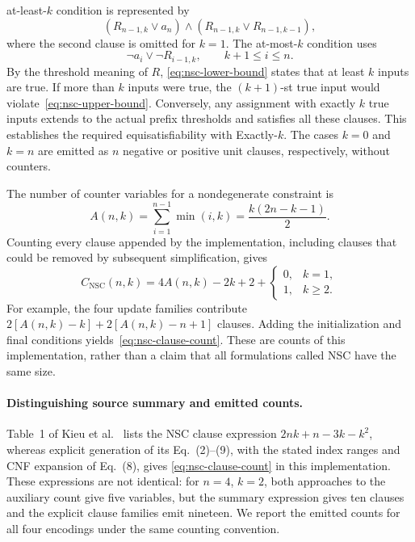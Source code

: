 \documentclass[a4paper,fleqn]{cas-sc}
\begin{document}
at-least-$k$ condition is represented by
\begin{equation}
 (R_{n-1,k}\lor a_n)\land
 (R_{n-1,k}\lor R_{n-1,k-1}),
 \label{eq:nsc-lower-bound}
\end{equation}
where the second clause is omitted for $k=1$. The at-most-$k$ condition
uses
\begin{equation}
 \neg a_i\lor\neg R_{i-1,k},\qquad k+1\leq i\leq n.
 \label{eq:nsc-upper-bound}
\end{equation}
By the threshold meaning of $R$, \eqref{eq:nsc-lower-bound} states that
at least $k$ inputs are true. If more than $k$ inputs were true, the
$(k+1)$-st true input would violate~\eqref{eq:nsc-upper-bound}. Conversely,
any assignment with exactly $k$ true inputs extends to the actual prefix
thresholds and satisfies all these clauses. This establishes the required
equisatisfiability with Exactly-$k$. The cases $k=0$ and $k=n$ are emitted
as $n$ negative or positive unit clauses, respectively, without counters.

The number of counter variables for a nondegenerate constraint is
\begin{equation}
 A(n,k)=\sum_{i=1}^{n-1}\min(i,k)
       =\frac{k(2n-k-1)}{2}.
 \label{eq:nsc-aux-count}
\end{equation}
Counting every clause appended by the implementation, including clauses
that could be removed by subsequent simplification, gives
\begin{equation}
 C_{\mathrm{NSC}}(n,k)
 =4A(n,k)-2k+2+\begin{cases}0,&k=1,\\1,&k\geq2.\end{cases}
 \label{eq:nsc-clause-count}
\end{equation}
For example, the four update families contribute
$2[A(n,k)-k]+2[A(n,k)-n+1]$ clauses. Adding the initialization and final
conditions yields~\eqref{eq:nsc-clause-count}. These are counts of this
implementation, rather than a claim that all formulations called NSC have
the same size.

\paragraph{Distinguishing source summary and emitted counts.}
Table~1 of Kieu et al.~\cite{kieu2025nse} lists the NSC clause expression
$2nk+n-3k-k^2$, whereas explicit generation of its Eq.~(2)--(9), with
the stated index ranges and CNF expansion of Eq.~(8), gives
\eqref{eq:nsc-clause-count} in this implementation. These expressions
are not identical: for $n=4$, $k=2$, both approaches to the auxiliary
count give five variables, but the summary expression gives ten
clauses and the explicit clause families emit nineteen. We report the
emitted counts for all four encodings under the same counting convention.
\end{document}
